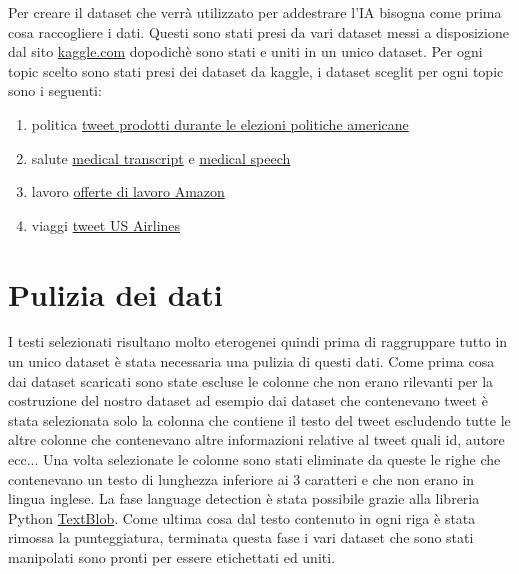 Per creare il dataset che verrà utilizzato per addestrare l'IA bisogna come prima cosa raccogliere i dati. Questi sono stati presi da vari dataset messi a disposizione dal sito \href{https://www.kaggle.com/}{kaggle.com} dopodichè sono stati  e uniti in un unico dataset.
Per ogni topic scelto sono stati presi dei dataset da kaggle, i dataset sceglit per ogni topic sono i seguenti:
\begin{enumerate}
    \item politica \href{https://www.kaggle.com/kinguistics/election-day-tweets#election_day_tweets.csv}{tweet prodotti durante le elezioni politiche americane}
    \item salute \href{https://www.kaggle.com/tboyle10/medicaltranscriptions}{medical transcript} e \href{https://www.kaggle.com/paultimothymooney/medical-speech-transcription-and-intent#overview-of-recordings.csv}{medical speech}
    \item lavoro \href{https://www.kaggle.com/atahmasb/amazon-job-skills}{offerte di lavoro Amazon}
    \item viaggi \href{https://www.kaggle.com/crowdflower/twitter-airline-sentiment#Tweets.csv}{tweet US Airlines}
\end{enumerate}
\section{Pulizia dei dati}
I testi selezionati risultano molto eterogenei quindi prima di raggruppare tutto in un unico dataset è stata necessaria una pulizia di questi dati.\newline
Come prima cosa dai dataset scaricati sono state escluse le colonne che non erano rilevanti per la costruzione del nostro dataset ad esempio dai dataset che contenevano tweet è stata selezionata solo la colonna che contiene il testo del tweet escludendo tutte le altre colonne che contenevano altre informazioni relative al tweet quali id, autore ecc...\newline
Una volta selezionate le colonne sono stati eliminate da queste le righe che contenevano un testo di lunghezza inferiore ai 3 caratteri e che non erano in lingua inglese. La fase language detection è stata possibile grazie alla libreria Python  \href{https://textblob.readthedocs.io/en/dev/}{TextBlob}.\newline
Come ultima cosa dal testo contenuto in ogni riga è stata rimossa la punteggiatura, terminata questa fase i vari dataset che sono stati manipolati sono pronti per essere etichettati ed uniti. 
